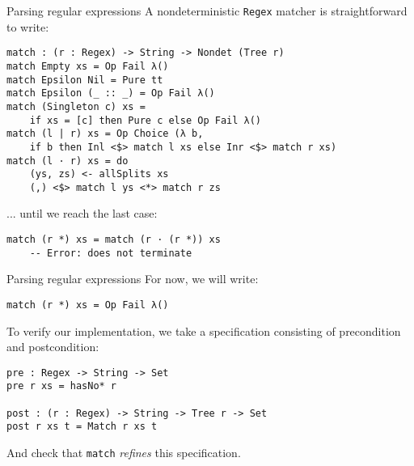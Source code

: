 \documentclass{beamer}
\newcommand{\Agda}[1]{\texttt{\footnotesize #1}\xspace}
\newcommand{\Regex}{\Agda{Regex}}
\begin{document}
\begin{frame}[fragile]{Parsing regular expressions}
A nondeterministic \Regex matcher is straightforward to write:
\begin{verbatim}
match : (r : Regex) -> String -> Nondet (Tree r)
match Empty xs = Op Fail λ()
match Epsilon Nil = Pure tt
match Epsilon (_ :: _) = Op Fail λ()
match (Singleton c) xs =
    if xs = [c] then Pure c else Op Fail λ()
match (l | r) xs = Op Choice (λ b,
    if b then Inl <$> match l xs else Inr <$> match r xs)
match (l · r) xs = do
    (ys, zs) <- allSplits xs
    (,) <$> match l ys <*> match r zs
\end{verbatim}

\pause
... until we reach the last case:
\begin{verbatim}
match (r *) xs = match (r · (r *)) xs
    -- Error: does not terminate
\end{verbatim}

\end{frame}

\begin{frame}[fragile]{Parsing regular expressions}
For now, we will write:
\vspace{-\baselineskip}
\begin{verbatim}
match (r *) xs = Op Fail λ()
\end{verbatim}
\vspace{\baselineskip}

\pause

To verify our implementation, we take a specification consisting of precondition and postcondition:
\begin{verbatim}
pre : Regex -> String -> Set
pre r xs = hasNo* r

post : (r : Regex) -> String -> Tree r -> Set
post r xs t = Match r xs t
\end{verbatim}

And check that \Agda{match} \emph{refines} this specification.

\end{frame}
\end{document}
